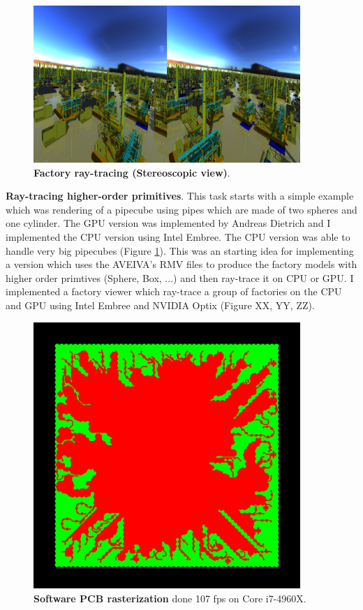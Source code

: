 \documentclass[]{report}
\begin{document}
\begin{figure}[!ht]
	\centering
	\includegraphics[width=0.90\textwidth]{./figs/stereo.png}
	\caption[Factory ray-tracing (Stereoscopic view)]{\textbf{Factory ray-tracing (Stereoscopic view)}.}
	\label{fig:pipecube}
\end{figure}

\textbf{Ray-tracing higher-order primitives}. This task starts with a simple example which was rendering of a pipecube using pipes which are made of two spheres and one cylinder. The GPU version was implemented by Andreas Dietrich and I implemented the CPU version using Intel Embree. The CPU version was able to handle very big pipecubes (Figure \ref{fig:pipecube}). This was an starting idea for implementing a version which uses the AVEIVA's RMV files to produce the factory models with higher order primtives (Sphere, Box, ...) and then ray-trace it on CPU or GPU. I implemented a factory viewer which ray-trace a group of factories on the CPU and GPU using Intel Embree and NVIDIA Optix (Figure XX, YY, ZZ).

\begin{figure}[!ht]
	\centering
	\includegraphics[width=0.90\textwidth]{./figs/rasterizer2D.png}
	\caption[PCB 2D Rasterization]{\textbf{Software PCB rasterization} done 107 fps on Core i7-4960X.}
	\label{fig:twodimRaster}
\end{figure}
\end{document}

